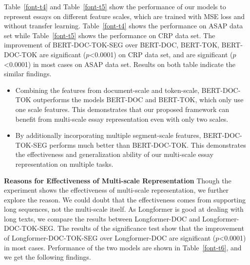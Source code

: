 \documentclass[11pt]{article}
\begin{document}
Table~\ref{font-t4} and Table~\ref{font-t5} show the performance of our models to represent essays on different feature scales, which are trained with MSE loss and without transfer learning.
Table~\ref{font-t4} shows the performance on ASAP data set while Table~\ref{font-t5} shows the performance on CRP data set. The improvement of BERT-DOC-TOK-SEG over BERT-DOC, BERT-TOK, BERT-DOC-TOK are significant ($p$<0.0001) on CRP data set, and are significant ($p$<0.0001) in most cases on ASAP data set.
Results on both table indicate the similar findings.
\begin{itemize}

\item Combining the features from document-scale and token-scale, BERT-DOC-TOK outperforms the models BERT-DOC and BERT-TOK, which only use one scale features.
This demonstrates that our proposed framework can benefit from multi-scale essay representation even with only two scales. 


\item By additionally incorporating multiple segment-scale features, BERT-DOC-TOK-SEG performs much better than BERT-DOC-TOK.
This demonstrates the effectiveness and generalization ability of our multi-scale essay representation on multiple tasks.




\begin{table}[h!]
\begin{center}
\caption{\label{font-t6} Performance of multi-scale Longformer models on ASAP data set.}
\end{center}
\end{table}

\end{itemize}

\textbf{Reasons for Effectiveness of Multi-scale Representation}
Though the experiment shows the effectiveness of multi-scale representation, we further explore the reason.
We could doubt that the effectiveness comes from supporting long sequences, not the multi-scale itself.
As Longformer is good at dealing with long texts, we compare the results between Longformer-DOC and Longformer-DOC-TOK-SEG. The results of the significance test show that the improvement of Longformer-DOC-TOK-SEG over Longformer-DOC are significant ($p$<0.0001) in most cases. Performance of the two models are shown in Table~\ref{font-t6}, and we get the following findings. 
\end{document}
